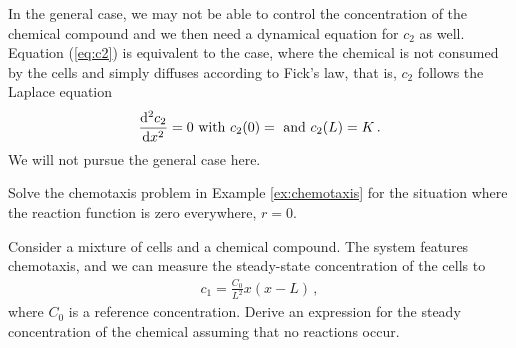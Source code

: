 In the general case, we may not be able to control the concentration of the
chemical compound and we then need a dynamical equation for $c_2$ as well.
Equation (\ref{eq:c2}) is equivalent to the case, where the chemical is not
consumed by the cells and simply diffuses according to Fick's law, that is,
$c_2$ follows the Laplace equation 
\begin{eqnarray}
	\frac{\d^2 c_2}{\d x^2} = 0 \ \text{with} \ c_2(0) = \ \text{and} \ c_2(L) =
	K \, .
\end{eqnarray}
We will not pursue the general case here.

\begin{exerciseregion}
	\begin{exercise}
		Solve the chemotaxis problem in Example \ref{ex:chemotaxis} for the
		situation where the reaction function is zero everywhere, $r=0$.
	\end{exercise}
	\begin{exercise}
		Consider a mixture of cells and a chemical compound. The system features
		chemotaxis, and we can measure the steady-state concentration of the cells to 
		\begin{eqnarray}
			c_1 = \frac{C_0}{L^2} x (x-L) \, ,
		\end{eqnarray}
		where $C_0$ is a reference concentration. Derive an expression for the
		steady concentration of the chemical assuming that no reactions occur.
	\end{exercise}
\end{exerciseregion}





















